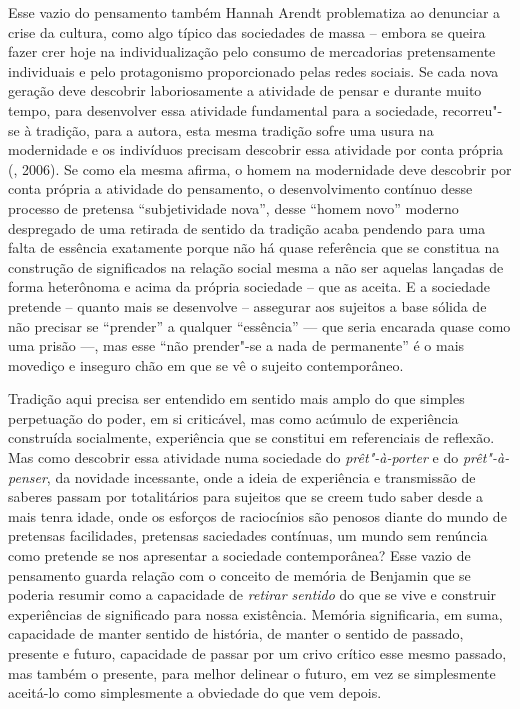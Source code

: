 Esse vazio do pensamento também Hannah Arendt problematiza ao denunciar
a crise da cultura, como algo típico das sociedades de massa -- embora
se queira fazer crer hoje na individualização pelo consumo de
mercadorias pretensamente individuais e pelo protagonismo proporcionado
pelas redes sociais. Se cada nova geração deve descobrir laboriosamente
a atividade de pensar e durante muito tempo, para desenvolver essa
atividade fundamental para a sociedade, recorreu"-se à tradição, para a
autora, esta mesma tradição sofre uma usura na modernidade e os
indivíduos precisam descobrir essa atividade por conta própria (,
2006). Se como ela mesma afirma, o homem na modernidade deve descobrir
por conta própria a atividade do pensamento, o desenvolvimento contínuo
desse processo de pretensa ``subjetividade nova'', desse ``homem novo''
moderno despregado de uma retirada de sentido da tradição acaba pendendo
para uma falta de essência exatamente porque não há quase referência que
se constitua na construção de significados na relação social mesma a não
ser aquelas lançadas de forma heterônoma e acima da própria sociedade --
que as aceita. E a sociedade pretende -- quanto mais se desenvolve --
assegurar aos sujeitos a base sólida de não precisar se ``prender'' a
qualquer ``essência'' --- que seria encarada quase como uma prisão ---,
mas esse ``não prender"-se a nada de permanente'' é o mais movediço e
inseguro chão em que se vê o sujeito contemporâneo.

Tradição aqui precisa ser entendido em sentido mais amplo do que simples
perpetuação do poder, em si criticável, mas como acúmulo de experiência
construída socialmente, experiência que se constitui em referenciais de
reflexão. Mas como descobrir essa atividade numa sociedade do
\emph{prêt"-à-porter} e do \emph{prêt"-à-penser}, da novidade incessante,
onde a ideia de experiência e transmissão de saberes passam por
totalitários para sujeitos que se creem tudo saber desde a mais tenra
idade, onde os esforços de raciocínios são penosos diante do mundo de
pretensas facilidades, pretensas saciedades contínuas, um mundo sem
renúncia como pretende se nos apresentar a sociedade contemporânea? Esse
vazio de pensamento guarda relação com o conceito de memória de Benjamin
que se poderia resumir como a capacidade de \emph{retirar
sentido} do que se vive e construir experiências de significado para
nossa existência. Memória significaria, em suma, capacidade de manter
sentido de história, de manter o sentido de passado, presente e futuro,
capacidade de passar por um crivo crítico esse mesmo passado, mas também
o presente, para melhor delinear o futuro, em vez se simplesmente
aceitá-lo como simplesmente a obviedade do que vem depois.

